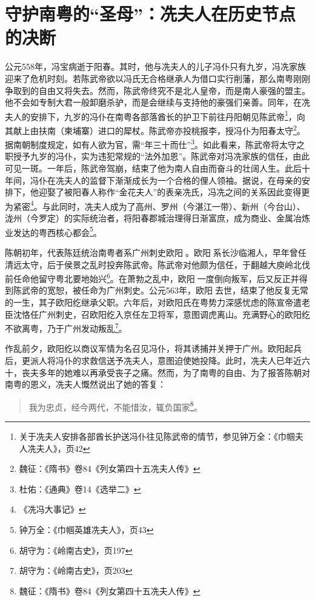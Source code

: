 \section{守护南粤的“圣母”：冼夫人在历史节点的决断}

公元558年，冯宝病逝于阳春。其时，他与冼夫人的儿子冯仆只有九岁，冯冼家族迎来了危机时刻。若陈武帝欲以冯氏无合格继承人为借口实行削藩，那么南粤刚刚争取到的自由又将失去。然而，陈武帝终究不是北人皇帝，而是南人豪强的盟主。他不会如专制大君一般卸磨杀驴，而是会继续与支持他的豪强们亲善。同年，在冼夫人的安排下，九岁的冯仆在南粤各部落酋长的护卫下前往丹阳朝见陈武帝\footnote{关于冼夫人安排各部酋长护送冯仆往见陈武帝的情节，参见钟万全：《巾帼夫人冼夫人》，页42}，向其献上由扶南（柬埔寨）进口的犀杖。陈武帝亦投桃报李，授冯仆为阳春太守\footnote{魏征：《隋书》卷84《列女第四十五冼夫人传》}。据南朝制度规定，如有人欲为官，需“年三十而仕”\footnote{杜佑：《通典》卷14《选举二》}。如此看来，陈武帝将太守之职授予九岁的冯仆，实为违犯常规的“法外加恩”。陈武帝对冯冼家族的信任，由此可见一斑。一年后，陈武帝驾崩，结束了他为南人自由而奋斗的壮阔人生。此后十年间，冯仆在冼夫人的监督下渐渐成长为一个合格的俚人领袖。据说，在母亲的安排下，他迎娶了被阳春人称作“金花夫人”的表亲冼氏，冯冼之间的关系因此变得更为紧密\footnote{《冼冯大事记》}。与此同时，冼夫人成为了高州、罗州（今湛江一带）、新州（今台山）、泷州（今罗定）的实际统治者，将阳春郡城治理得日渐富庶，成为商业、金属冶炼业发达的粤西核心都会\footnote{钟万全：《巾帼英雄冼夫人》，页43}。

陈朝初年，代表陈廷统治南粤者系广州刺史欧阳。欧阳系长沙临湘人，早年曾任清远太守，后于侯景之乱时投奔陈武帝。陈武帝对他颇为信任，于翻越大庾岭北伐前任命他留守粤北要地始兴\footnote{胡守为：《岭南古史》，页197}。在萧勃之乱中，欧阳一度倒向叛军，后又反正并得到陈武帝的宽恕，被任命为广州刺史。公元563年，欧阳去世，结束了他反复无常的一生，其子欧阳纥继承父职。六年后，对欧阳氏在粤势力深感忧虑的陈宣帝遣老臣沈恪任广州刺史，召欧阳纥入京任左卫将军，意图调虎离山。充满野心的欧阳纥不欲离粤，乃于广州发动叛乱\footnote{胡守为：《岭南古史》，页203}。

作乱前夕，欧阳纥以商议军情为名召见冯仆，将其诱捕并关押于广州。欧阳起兵后，更派人将冯仆的求救信送予冼夫人，意图迫使她投降。此时，冼夫人已年近六十，丧夫多年的她难以再承受丧子之痛。然而，为了南粤的自由、为了报答陈朝对南粤的恩义，冼夫人慨然说出了她的答复：

\begin{quote}
	我为忠贞，经今两代，不能惜汝，辄负国家\footnote{魏征：《隋书》卷84《列女第四十五冼夫人传》}。
\end{quote}


